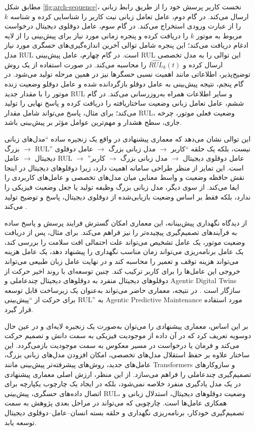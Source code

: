 مطابق شکل \ref{fig:arch-sequence}، نخست کاربر پرسش خود را از طریق رابط زبانی ارسال می‌کند. در گام دوم، عامل تعامل زبانی نیت کاربر را شناسایی کرده و شناسه $k$ را از عبارت ورودی استخراج می‌کند. در گام سوم، عامل دوقلوی دیجیتال درخواست مربوط به موتور $k$ را دریافت کرده و پنجره زمانی مورد نیاز برای پیش‌بینی را از لایه ادغام دریافت می‌کند؛ این پنجره شامل توالی آخرین اندازه‌گیری‌های حسگری مورد نیاز مدل \gls{RUL} است. در گام چهارم، عامل پیش‌بینی \gls{RUL} این توالی را به مدل تخصصی ارسال کرده و $\widehat{RUL}_k(t)$ را محاسبه می‌کند. در صورت استفاده از یک روش توضیح‌پذیر، اطلاعاتی مانند اهمیت نسبی حسگرها نیز در همین مرحله تولید می‌شود. در گام پنجم، نتیجه پیش‌بینی به عامل دوقلو بازگردانده شده و عامل دوقلو وضعیت زنده موتور را با مقدار جدید \gls{RUL} و سایر اطلاعات همراه به‌روزرسانی می‌کند. در گام ششم، عامل تعامل زبانی وضعیت ساختاریافته را دریافت کرده و پاسخ نهایی را تولید می‌کند؛ برای مثال، پاسخ می‌تواند شامل مقدار \gls{RUL}، وضعیت فعلی موتور، چرخه جاری، سطح هشدار و مهم‌ترین عوامل مؤثر بر پیش‌بینی باشد.

این توالی نشان می‌دهد که معماری پیشنهادی در واقع یک زنجیره ساده ``مدل‌های زبانی بزرگ $\rightarrow$ \gls{RUL}'' نیست، بلکه یک حلقه ``کاربر $\rightarrow$ مدل زبانی بزرگ $\rightarrow$ عامل دوقلوی دیجیتال $\rightarrow$ عامل \gls{RUL} $\rightarrow$ عامل دوقلوی دیجیتال $\rightarrow$ مدل زبانی بزرگ $\rightarrow$ کاربر'' است. این تمایز از منظر طراحی سامانه اهمیت دارد، زیرا دوقلو‌های دیجیتال در اینجا نقش حافظه وضعیت و واسط معنایی میان مدل‌های تخصصی و عامل‌های کاربردی را ایفا می‌کند. از سوی دیگر، مدل‌ زبانی بزرگ وظیفه تولید یا جعل وضعیت فیزیکی را ندارد، بلکه فقط بر اساس وضعیت بازیابی‌شده از دوقلوی دیجیتال، پاسخ و توضیح تولید می‌کند \cite{zhou2026dtai,fu2026genaidt}.

از دیدگاه نگهداری پیش‌بینانه، این معماری امکان گسترش فرایند پرسش و پاسخ ساده به فرآیندهای تصمیم‌گیری پیچیده‌تر را نیز فراهم می‌کند. برای مثال، پس از دریافت وضعیت موتور، یک عامل تشخیص می‌تواند علت احتمالی افت سلامت را بررسی کند، یک عامل برنامه‌ریزی می‌تواند زمان مناسب نگهداری را پیشنهاد دهد، یک عامل هزینه می‌تواند هزینه توقف و تعمیر را محاسبه کند و در نهایت عامل زبان طبیعی می‌تواند خروجی این عامل‌ها را برای کاربر ترکیب کند. چنین توسعه‌ای با روند اخیر حرکت از دوقلو‌های دیجیتال منفرد به دوقلو‌های دیجیتال چندعاملی و \glspl{Agentic Digital Twin}  سازگار است \cite{coulibaly2026madtdt}. در نتیجه، معماری حاضر می‌تواند به‌عنوان یک زیرساخت قابل توسعه برای حرکت از ``پیش‌بینی \gls{RUL}'' به \gls{Agentic Predictive Maintenance} مورد استفاده قرار گیرد.

بر این اساس، معماری پیشنهادی را می‌توان به‌صورت یک زنجیره لایه‌ای و در عین حال دوسویه تعریف کرد که در آن داده از موجودیت فیزیکی به سمت دانش و تصمیم حرکت می‌کند و فرمان یا درخواست در مسیر معکوس به سمت موجودیت بازمی‌گردد. این ساختار علاوه بر حفظ استقلال مدل‌های تخصصی، امکان افزودن مدل‌های زبانی بزرگ، عامل‌های جدید، روش‌های پیشرفته‌تر پیش‌بینی مانند \glspl{Transformer} و سازوکارهای تصمیم‌گیری چندعاملی را فراهم می‌سازد. از این منظر، ارزش اصلی معماری پیشنهادی در یک مدل یادگیری منفرد خلاصه نمی‌شود، بلکه در ایجاد یک چارچوب یکپارچه برای اتصال داده‌های حسگری، پیش‌بینی \gls{RUL}، وضعیت دوقلو‌های دیجیتال، استدلال زبانی و همکاری عامل‌ها است. چارچوبی که می‌تواند در مراحل بعدی پژوهش به سمت تصمیم‌گیری خودکار، برنامه‌ریزی نگهداری و حلقه بسته انسان--عامل--دوقلوی‌ دیجیتال توسعه یابد.

